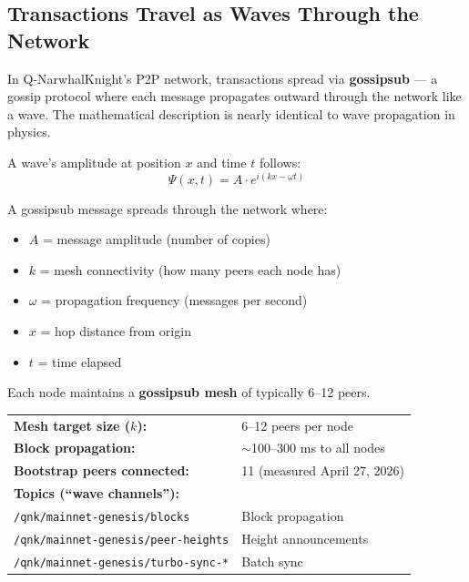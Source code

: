 \documentclass[11pt,a4paper]{article}
\begin{document}
\subsection{Transactions Travel as Waves Through the Network}

In Q-NarwhalKnight's P2P network, transactions spread via \textbf{gossipsub} --- a gossip protocol where each message propagates outward through the network like a wave. The mathematical description is nearly identical to wave propagation in physics.

A wave's amplitude at position $x$ and time $t$ follows:
\begin{equation}
\Psi(x, t) = A \cdot e^{i(kx - \omega t)}
\end{equation}

A gossipsub message spreads through the network where:
\begin{itemize}
    \item $A$ = message amplitude (number of copies)
    \item $k$ = mesh connectivity (how many peers each node has)
    \item $\omega$ = propagation frequency (messages per second)
    \item $x$ = hop distance from origin
    \item $t$ = time elapsed
\end{itemize}

\begin{tcolorbox}[colback=deeporange!10,colframe=deeporange,title=\textbf{Real Stat: Gossipsub Mesh on Live Network}]
Each node maintains a \textbf{gossipsub mesh} of typically 6--12 peers.\\[4pt]
\begin{tabular}{ll}
\textbf{Mesh target size ($k$):} & 6--12 peers per node \\
\textbf{Block propagation:} & $\sim$100--300 ms to all nodes \\
\textbf{Bootstrap peers connected:} & 11 (measured April 27, 2026) \\
\textbf{Topics (``wave channels''):} & \\
\quad\texttt{/qnk/mainnet-genesis/blocks} & Block propagation \\
\quad\texttt{/qnk/mainnet-genesis/peer-heights} & Height announcements \\
\quad\texttt{/qnk/mainnet-genesis/turbo-sync-*} & Batch sync \\
\end{tabular}
\end{tcolorbox}
\end{document}
